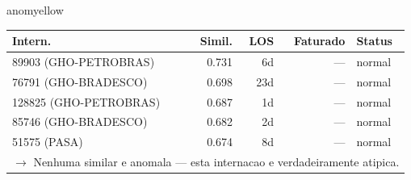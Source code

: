 \documentclass[a4paper,10pt]{article}
\begin{document}
\begin{anomalycard}[Internacao 8760 | GHO-PETROBRAS | MODERADO (z=2.35)]{anomyellow}
\begin{tabular}{l r r r l}\toprule\textbf{Intern.} & \textbf{Simil.} & \textbf{LOS} & \textbf{Faturado} & \textbf{Status} \\\midrule
89903 (GHO-PETROBRAS) & 0.731 & 6d & --- & \textcolor{jcubeblue}{normal} \\
76791 (GHO-BRADESCO) & 0.698 & 23d & --- & \textcolor{jcubeblue}{normal} \\
128825 (GHO-PETROBRAS) & 0.687 & 1d & --- & \textcolor{jcubeblue}{normal} \\
85746 (GHO-BRADESCO) & 0.682 & 2d & --- & \textcolor{jcubeblue}{normal} \\
51575 (PASA) & 0.674 & 8d & --- & \textcolor{jcubeblue}{normal} \\
\multicolumn{5}{l}{\textcolor{jcubeblue}{\small $\rightarrow$ Nenhuma similar e anomala --- esta internacao e verdadeiramente atipica.}} \\
\bottomrule\end{tabular}


\end{anomalycard}

\newpage
\end{document}
